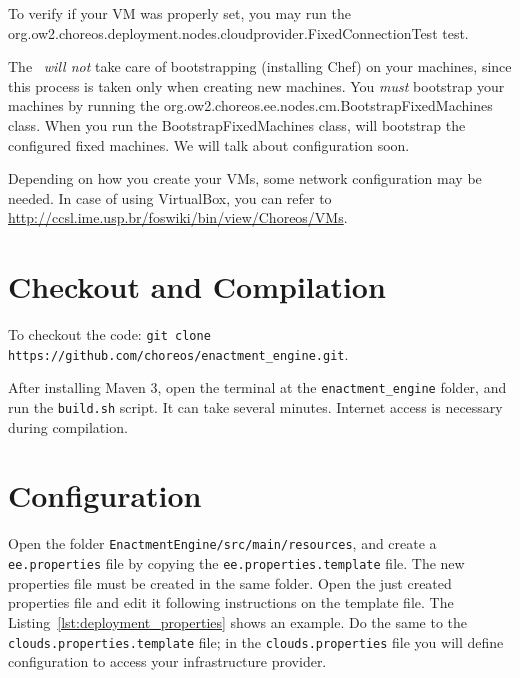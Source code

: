 To verify if your VM was properly set, you may run the \\ \textsf{org.ow2.choreos.deployment.nodes.cloudprovider.FixedConnectionTest} test.

The \ee\ \emph{will not} take care of bootstrapping (installing Chef) on your machines, since this process is taken only when creating new machines. 
You \emph{must} bootstrap your machines by running the \textsf{org.ow2.choreos.ee.nodes.cm.BootstrapFixedMachines} class.
When you run the \textsf{BootstrapFixedMachines} class, \ee will bootstrap the configured fixed machines. We will talk about configuration soon.

Depending on how you create your VMs, some network configuration may be needed. In case of using VirtualBox, you can refer to \url{http://ccsl.ime.usp.br/foswiki/bin/view/Choreos/VMs}.


\section{Checkout and Compilation}

To checkout the code: \texttt{git clone https://github.com/choreos/enactment\_engine.git}. 

After installing Maven 3, open the terminal at the \texttt{enactment\_engine} folder, and run the \texttt{build.sh} script. It can take several minutes. Internet access is necessary during compilation.

\section{Configuration}

Open the folder \texttt{EnactmentEngine/src/main/resources}, and create a \texttt{ee.properties} file by copying the \texttt{ee.properties.template} file. The new properties file must be created in the same folder. Open the just created properties file and edit it following instructions on the template file. The Listing~\ref{lst:deployment_properties} shows an example. Do the same to the \texttt{clouds.properties.template} file; in the \texttt{clouds.properties} file you will define configuration to access your infrastructure provider.

\lstset{
numbers=left
}

